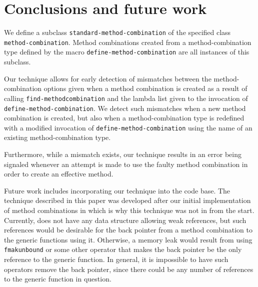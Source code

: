 \section{Conclusions and future work}
\label{sec-conclusions}

We define a subclass \texttt{standard-method-combination} of the
specified class \texttt{method-combination}.  Method combinations
created from a method-combination type defined by the macro
\texttt{define-method-combination} are all instances of this subclass.

Our technique allows for early detection of mismatches between the
method-combination options given when a method combination is created
as a result of calling \texttt{find-method\-combination} and the lambda
list given to the invocation of \texttt{define-method-combination}.
We detect such mismatches when a new method combination is created,
but also when a method-combination type is redefined with a modified
invocation of \texttt{define-method-combination} using the name
of an existing method-combination type.

Furthermore, while a mismatch exists, our technique results in an
error being signaled whenever an attempt is made to use the faulty
method combination in order to create an effective method.

Future work includes incorporating our technique into the \sicl{} code
base.  The technique described in this paper was developed after our
initial implementation of method combinations in \sicl{} which is why
this technique was not in \sicl{} from the start.  Currently, \sicl{}
does not have any data structure allowing weak references, but such
references would be desirable for the back pointer from a method
combination to the generic functions using it.  Otherwise, a memory
leak would result from using \texttt{fmakunbound} or some other
operator that makes the back pointer be the only reference to the
generic function.  In general, it is impossible to have such operators
remove the back pointer, since there could be any number of references
to the generic function in question.
